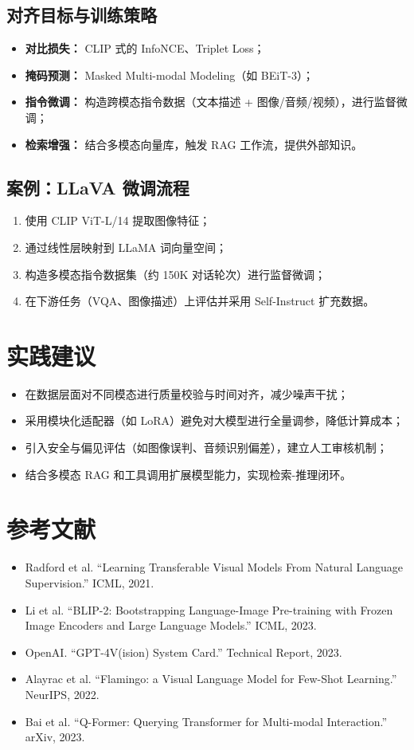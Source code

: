 \documentclass[UTF8,zihao=-4]{ctexart}
\begin{document}
\subsection{对齐目标与训练策略}
\begin{itemize}
  \item \textbf{对比损失：} CLIP 式的 InfoNCE、Triplet Loss；
  \item \textbf{掩码预测：} Masked Multi-modal Modeling（如 BEiT-3）；
  \item \textbf{指令微调：} 构造跨模态指令数据（文本描述 + 图像/音频/视频），进行监督微调；
  \item \textbf{检索增强：} 结合多模态向量库，触发 RAG 工作流，提供外部知识。
\end{itemize}

\subsection{案例：LLaVA 微调流程}
\begin{enumerate}
  \item 使用 CLIP ViT-L/14 提取图像特征；
  \item 通过线性层映射到 LLaMA 词向量空间；
  \item 构造多模态指令数据集（约 150K 对话轮次）进行监督微调；
  \item 在下游任务（VQA、图像描述）上评估并采用 Self-Instruct 扩充数据。
\end{enumerate}

\section*{实践建议}
\begin{itemize}
  \item 在数据层面对不同模态进行质量校验与时间对齐，减少噪声干扰；
  \item 采用模块化适配器（如 LoRA）避免对大模型进行全量调参，降低计算成本；
  \item 引入安全与偏见评估（如图像误判、音频识别偏差），建立人工审核机制；
  \item 结合多模态 RAG 和工具调用扩展模型能力，实现检索-推理闭环。
\end{itemize}

\section*{参考文献}
\begin{itemize}
  \item Radford et al. ``Learning Transferable Visual Models From Natural Language Supervision.'' ICML, 2021.
  \item Li et al. ``BLIP-2: Bootstrapping Language-Image Pre-training with Frozen Image Encoders and Large Language Models.'' ICML, 2023.
  \item OpenAI. ``GPT-4V(ision) System Card.'' Technical Report, 2023.
  \item Alayrac et al. ``Flamingo: a Visual Language Model for Few-Shot Learning.'' NeurIPS, 2022.
  \item Bai et al. ``Q-Former: Querying Transformer for Multi-modal Interaction.'' arXiv, 2023.
\end{itemize}
\end{document}
